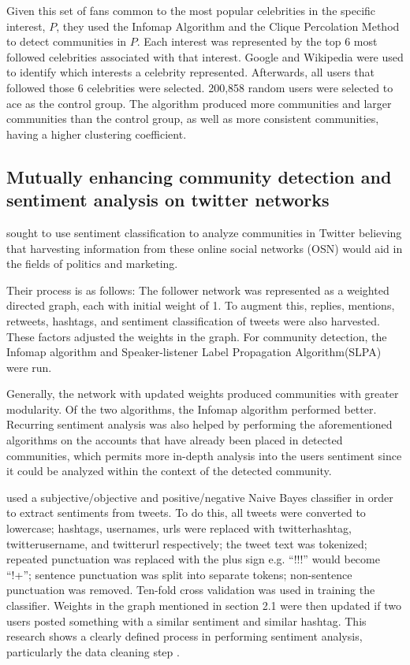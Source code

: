 Given this set of fans common to the most popular celebrities in the specific interest, $P$, they used the Infomap Algorithm and the Clique Percolation Method to detect communities in $P$. Each interest was represented by the top 6 most followed celebrities associated with that interest. Google and Wikipedia were used to identify which interests a celebrity represented. Afterwards, all users that followed those 6 celebrities were selected. 200,858 random users were selected to ace as the control group. The algorithm produced more communities and larger communities than the control group, as well as more consistent communities, having a higher clustering coefficient.


\subsection{Mutually enhancing community detection and sentiment analysis on twitter networks}


 sought to use sentiment classification to analyze communities in Twitter believing that harvesting information from these online social networks (OSN) would aid in the fields of politics and marketing. 


Their process is as follows: The follower network was represented as a weighted directed graph, each with initial weight of 1. To augment this, replies, mentions, retweets, hashtags, and sentiment classification of tweets were also harvested. These factors adjusted the weights in the graph. For community detection, the Infomap algorithm and Speaker-listener Label Propagation Algorithm(SLPA) were run. 


Generally, the network with updated weights produced communities with greater modularity. Of the two algorithms, the Infomap algorithm performed better. Recurring sentiment analysis was also helped by performing the aforementioned algorithms on the accounts that have already been placed in detected communities, which permits more in-depth analysis into the user\vtick s sentiment since it could be analyzed within the context of the detected community.


 used a subjective/objective and positive/negative Naive Bayes classifier in order to extract sentiments from tweets. To do this, all tweets were converted to lowercase; hashtags, usernames, urls were replaced with twitterhashtag, twitterusername, and twitterurl respectively; the tweet text was tokenized; repeated punctuation was replaced with the plus sign e.g. ``!!!'' would become ``!+''; sentence punctuation was split into separate tokens; non-sentence punctuation was removed. Ten-fold cross validation was used in training the classifier. Weights in the graph mentioned in section 2.1 were then updated if two users posted something with a similar sentiment and similar hashtag. This research shows a clearly defined process in performing sentiment analysis, particularly the data cleaning step \cite{Deitrick:2013}.


